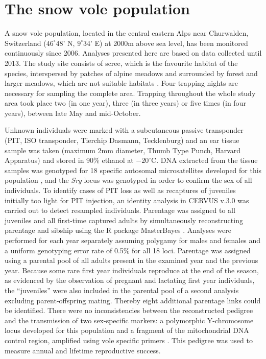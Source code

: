 \section{The snow vole population}\label{ap:snv}
\setcounter{table}{0}
\setcounter{equation}{0}
\setcounter{figure}{0}
A snow vole population, located in the central eastern Alps near Churwalden, Switzerland ($46^{\circ}$48' N, $9^{\circ}$34' E) at 2000m above sea level, has been monitored continuously since 2006. Analyses presented here are based on data collected until 2013. The study site consists of scree, which is the favourite habitat of the species, interspersed by patches of alpine meadows and surrounded by forest and larger meadows, which are not suitable habitats \parencite{Janeau1997}. Four trapping nights are necessary for sampling the complete area. Trapping throughout the whole study area took place two (in one year), three (in three years) or five times (in four years), between late May and mid-October. 

Unknown individuals were marked with a subcutaneous passive transponder (PIT, ISO transponder, Tierchip Dasmann, Tecklenburg) and an ear tissue sample was taken (maximum 2mm diameter, Thumb Type Punch, Harvard Apparatus) and stored in 90\% ethanol at $-20^{\circ}\mathrm{C}$. DNA extracted from the tissue samples was genotyped for 18 specific autosomal microsatellites developed for this population \parencite{Wandeler2008}, and the \textit{Sry} locus was genotyped in order to confirm the sex of all individuals. To identify cases of PIT loss as well as recaptures of juveniles initially too light for PIT injection, an identity analysis in CERVUS v.3.0 \parencite{Marshall1998} was carried out to detect resampled individuals.
Parentage was assigned to all juveniles and all first-time captured adults by simultaneously reconstructing parentage and sibship using the R package MasterBayes \parencite{Hadfield2006}. Analyses were performed for each year separately assuming polygamy for males and females and a uniform genotyping error rate of 0.5\% for all 18 loci. Parentage was assigned using a parental pool of all adults present in the examined year and the previous year. Because some rare first year individuals reproduce at the end of the season, as evidenced by the observation of pregnant and lactating first year individuals, the ``juveniles'' were also included in the parental pool of a second analysis excluding parent-offspring mating. Thereby eight additional parentage links could be identified. There were no inconsistencies between the reconstructed pedigree and the transmission of two sex-specific markers: a polymorphic Y-chromosome locus developed for this population \parencite{Wandeler2011} and a fragment of the mitochondrial DNA control region, amplified using vole specific primers \parencite{Haring2000}. This pedigree was used to measure annual and lifetime reproductive success.

